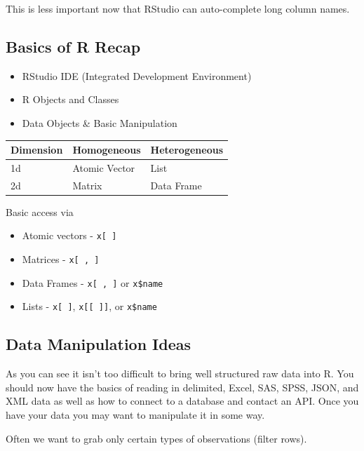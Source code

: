 \documentclass[
]{book}
\theoremstyle{definition}
\theoremstyle{definition}
\theoremstyle{definition}
\theoremstyle{remark}
\begin{document}
This is less important now that RStudio can auto-complete long column names.

\hypertarget{basics-of-r-recap-1}{%
\subsection{Basics of R Recap}\label{basics-of-r-recap-1}}

\begin{itemize}
\item
  RStudio IDE (Integrated Development Environment)
\item
  R Objects and Classes
\item
  Data Objects \& Basic Manipulation
\end{itemize}

\begin{longtable}[]{@{}lll@{}}
\toprule
Dimension & Homogeneous & Heterogeneous\tabularnewline
\midrule
\endhead
1d & Atomic Vector & List\tabularnewline
2d & Matrix & Data Frame\tabularnewline
\bottomrule
\end{longtable}

Basic access via

\begin{itemize}
\item
  Atomic vectors - \texttt{x{[}\ {]}}
\item
  Matrices - \texttt{x{[}\ ,\ {]}}
\item
  Data Frames - \texttt{x{[}\ ,\ {]}} or \texttt{x\$name}
\item
  Lists - \texttt{x{[}\ {]}}, \texttt{x{[}{[}\ {]}{]}}, or \texttt{x\$name}
\end{itemize}

\hypertarget{data-manipulation-ideas-1}{%
\subsection{Data Manipulation Ideas}\label{data-manipulation-ideas-1}}

As you can see it isn't too difficult to bring well structured raw data into R. You should now have the basics of reading in delimited, Excel, SAS, SPSS, JSON, and XML data as well as how to connect to a database and contact an API. Once you have your data you may want to manipulate it in some way.

Often we want to grab only certain types of observations (filter rows).
\end{document}
